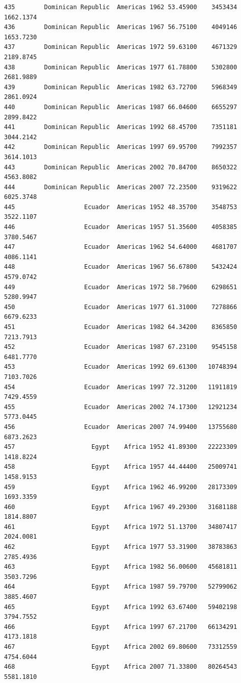 \documentclass[
  letterpaper,
  DIV=11,
  numbers=noendperiod]{scrreprt}
\begin{document}
\begin{verbatim}
435        Dominican Republic  Americas 1962 53.45900    3453434   1662.1374
436        Dominican Republic  Americas 1967 56.75100    4049146   1653.7230
437        Dominican Republic  Americas 1972 59.63100    4671329   2189.8745
438        Dominican Republic  Americas 1977 61.78800    5302800   2681.9889
439        Dominican Republic  Americas 1982 63.72700    5968349   2861.0924
440        Dominican Republic  Americas 1987 66.04600    6655297   2899.8422
441        Dominican Republic  Americas 1992 68.45700    7351181   3044.2142
442        Dominican Republic  Americas 1997 69.95700    7992357   3614.1013
443        Dominican Republic  Americas 2002 70.84700    8650322   4563.8082
444        Dominican Republic  Americas 2007 72.23500    9319622   6025.3748
445                   Ecuador  Americas 1952 48.35700    3548753   3522.1107
446                   Ecuador  Americas 1957 51.35600    4058385   3780.5467
447                   Ecuador  Americas 1962 54.64000    4681707   4086.1141
448                   Ecuador  Americas 1967 56.67800    5432424   4579.0742
449                   Ecuador  Americas 1972 58.79600    6298651   5280.9947
450                   Ecuador  Americas 1977 61.31000    7278866   6679.6233
451                   Ecuador  Americas 1982 64.34200    8365850   7213.7913
452                   Ecuador  Americas 1987 67.23100    9545158   6481.7770
453                   Ecuador  Americas 1992 69.61300   10748394   7103.7026
454                   Ecuador  Americas 1997 72.31200   11911819   7429.4559
455                   Ecuador  Americas 2002 74.17300   12921234   5773.0445
456                   Ecuador  Americas 2007 74.99400   13755680   6873.2623
457                     Egypt    Africa 1952 41.89300   22223309   1418.8224
458                     Egypt    Africa 1957 44.44400   25009741   1458.9153
459                     Egypt    Africa 1962 46.99200   28173309   1693.3359
460                     Egypt    Africa 1967 49.29300   31681188   1814.8807
461                     Egypt    Africa 1972 51.13700   34807417   2024.0081
462                     Egypt    Africa 1977 53.31900   38783863   2785.4936
463                     Egypt    Africa 1982 56.00600   45681811   3503.7296
464                     Egypt    Africa 1987 59.79700   52799062   3885.4607
465                     Egypt    Africa 1992 63.67400   59402198   3794.7552
466                     Egypt    Africa 1997 67.21700   66134291   4173.1818
467                     Egypt    Africa 2002 69.80600   73312559   4754.6044
468                     Egypt    Africa 2007 71.33800   80264543   5581.1810

\end{verbatim}
\end{document}
